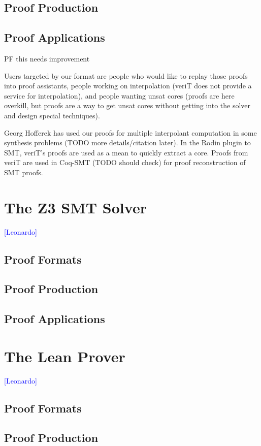 \documentclass{llncs}
\newcommand{\Note}[1]{\textcolor{blue}{[#1]}}
\begin{document}
\subsection{Proof Production}
\subsection{Proof Applications}

PF this needs improvement

Users targeted by our format are people who would like to replay those proofs into proof assistants, people working on interpolation (veriT does not provide a service for interpolation), and people wanting unsat cores (proofs are here overkill, but proofs are a way to get unsat cores without getting into the solver and design special techniques).

Georg Hofferek has used our proofs for multiple interpolant computation in some synthesis problems (TODO more details/citation later).  In the Rodin plugin to SMT, veriT's proofs are used as a mean to quickly extract a core.  Proofs from veriT are used in Coq-SMT (TODO should check) for proof reconstruction of SMT proofs.

\section{The Z3 SMT Solver}
\Note{Leonardo}
\subsection{Proof Formats}
\subsection{Proof Production}
\subsection{Proof Applications}

\section{The Lean Prover}
\Note{Leonardo}
\subsection{Proof Formats}
\subsection{Proof Production}
\end{document}

